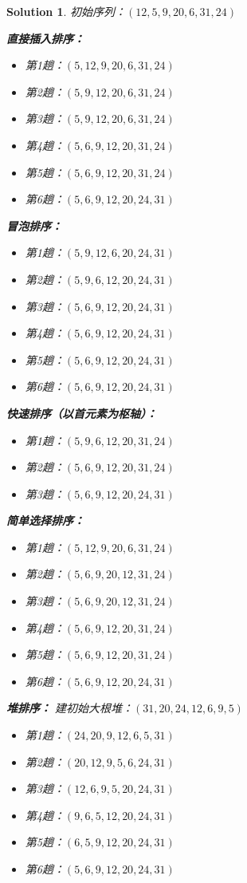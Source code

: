 \documentclass[12pt,a4paper]{amsart}
\newtheorem{solution}{Solution}[section]
\begin{document}
\begin{solution}
初始序列：$(12,5,9,20,6,31,24)$

\textbf{直接插入排序：}
\begin{itemize}
\item 第1趟：$(5,12,9,20,6,31,24)$
\item 第2趟：$(5,9,12,20,6,31,24)$
\item 第3趟：$(5,9,12,20,6,31,24)$
\item 第4趟：$(5,6,9,12,20,31,24)$
\item 第5趟：$(5,6,9,12,20,31,24)$
\item 第6趟：$(5,6,9,12,20,24,31)$
\end{itemize}

\textbf{冒泡排序：}
\begin{itemize}
\item 第1趟：$(5,9,12,6,20,24,31)$
\item 第2趟：$(5,9,6,12,20,24,31)$
\item 第3趟：$(5,6,9,12,20,24,31)$
\item 第4趟：$(5,6,9,12,20,24,31)$
\item 第5趟：$(5,6,9,12,20,24,31)$
\item 第6趟：$(5,6,9,12,20,24,31)$
\end{itemize}

\textbf{快速排序（以首元素为枢轴）：}
\begin{itemize}
\item 第1趟：$(5,9,6,12,20,31,24)$
\item 第2趟：$(5,6,9,12,20,31,24)$
\item 第3趟：$(5,6,9,12,20,24,31)$
\end{itemize}

\textbf{简单选择排序：}
\begin{itemize}
\item 第1趟：$(5,12,9,20,6,31,24)$
\item 第2趟：$(5,6,9,20,12,31,24)$
\item 第3趟：$(5,6,9,20,12,31,24)$
\item 第4趟：$(5,6,9,12,20,31,24)$
\item 第5趟：$(5,6,9,12,20,31,24)$
\item 第6趟：$(5,6,9,12,20,24,31)$
\end{itemize}

\textbf{堆排序：}
建初始大根堆：$(31,20,24,12,6,9,5)$
\begin{itemize}
\item 第1趟：$(24,20,9,12,6,5,31)$
\item 第2趟：$(20,12,9,5,6,24,31)$
\item 第3趟：$(12,6,9,5,20,24,31)$
\item 第4趟：$(9,6,5,12,20,24,31)$
\item 第5趟：$(6,5,9,12,20,24,31)$
\item 第6趟：$(5,6,9,12,20,24,31)$
\end{itemize}


\end{solution}
\end{document}
